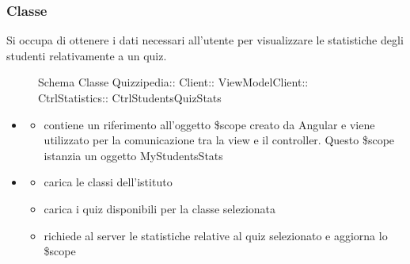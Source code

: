 \subsubsection{Classe }
Si occupa di ottenere i dati necessari all'utente per visualizzare le statistiche degli studenti relativamente a un quiz.
\begin{figure}[H]
\centering
\noindent{}
\caption[Schema Classe CtrlStudentsQuizStats]{Schema Classe Quizzipedia:: Client:: ViewModelClient:: CtrlStatistics:: CtrlStudentsQuizStats}
\end{figure}
\begin{itemize}
\item {}
\begin{itemize}
\item {}
\newline
contiene un riferimento all'oggetto \$scope creato da Angular e viene utilizzato per la comunicazione tra la view e il controller. Questo \$scope istanzia un oggetto MyStudentsStats
\end{itemize}
\item {}
\begin{itemize}
\item {}
\newline
carica le classi dell'istituto
\newline
\item {}
\newline
carica i quiz disponibili per la classe selezionata
\newline
\item {}
\newline
richiede al server le statistiche relative al quiz selezionato e aggiorna lo \$scope
\newline
\end{itemize}
\end{itemize}
